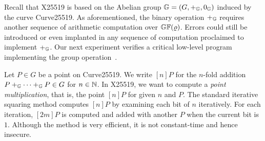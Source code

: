 
Recall that X25519 is based on the Abelian group $\mathbb{G} = (G, +_{\mathbb{G}},
0_{\mathbb{G}})$ induced by the curve Curve25519. As aforementioned, the binary
operation $+_{\mathbb{G}}$ requires another sequence of arithmetic computation
over $\mathbb{GF}(\varrho)$. Errors could still be introduced or even
implanted in any sequence of computation proclaimed to implement $+_{\mathbb{G}}$.
Our next experiment verifies a critical low-level program implementing
the group operation~\cite{BDL+:11:HSHSS,BDL+:12:HSHSS}.

Let $P \in G$ be a point on Curve25519. We write $[n]P$ for the
$n$-fold addition ${P +_{\mathbb{G}} \cdots +_{\mathbb{G}} P} \in G$ for $n \in \mathbb{N}$.
In X25519, we want to compute a \emph{point multiplication}, that is,
the point $[n]P$ for given $n$ and $P$. The standard iterative
squaring method computes $[n]P$ by examining each bit of $n$ iteratively.
For each iteration, $[2m]P$ is computed and
added with another $P$ when the current bit is $1$. Although the
method is very efficient, it is not constant-time and hence insecure. 


